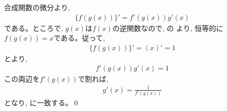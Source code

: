 合成関数の微分より, 
\begin{eqnarray}\{f(g(x))\}'= f'(g(x))g'(x)\label{eq:diff_fgxgx1}\end{eqnarray}
である。ところで, $g(x)$は$f(x)$の逆関数なので, の
より, 恒等的に$f(g(x))=x$である。従って, 
\begin{eqnarray}\{f(g(x))\}'=(x)'=1\label{eq:diff_fgxgx2}\end{eqnarray}
とより, 
\begin{eqnarray}f'(g(x))g'(x)=1\end{eqnarray}
この両辺を$f'(g(x))$で割れば, 
\begin{eqnarray}g'(x)=\frac{1}{f'(g(x))}\end{eqnarray}
となり, に一致する。\qed
\hv
